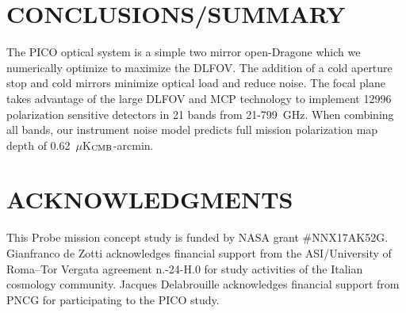 \documentclass[]{spie}  %
\begin{document}
\section{CONCLUSIONS/SUMMARY}

The PICO optical system is a simple two mirror open-Dragone which we numerically optimize to maximize the DLFOV.  The addition of a 
cold aperture stop and cold mirrors minimize optical load and reduce noise.  The focal plane takes advantage of the large DLFOV and MCP 
technology to implement 12996 polarization sensitive detectors in 21 bands from 21-799~GHz.  When combining all bands, our instrument 
noise model predicts full mission polarization map depth of 0.62~$\mu$K$_{\rm CMB}$-arcmin.






\section{ACKNOWLEDGMENTS}

This Probe mission concept study is funded by NASA grant \#NNX17AK52G.  Gianfranco de Zotti acknowledges financial support from the ASI/University of
Roma--Tor Vergata agreement n.-24-H.0 for study activities of the Italian cosmology community. Jacques
Delabrouille acknowledges financial support from PNCG for participating to the PICO study.


\end{document}
